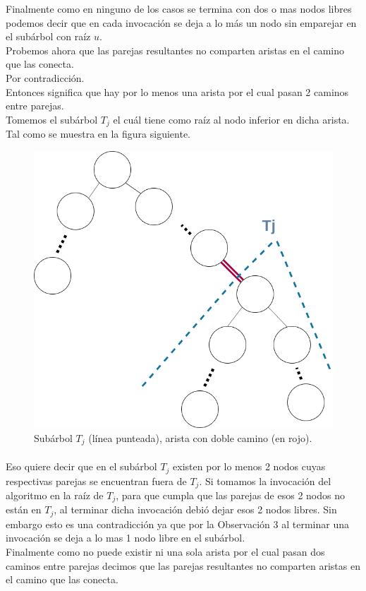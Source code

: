 \documentclass[12pt]{article}
\begin{document}
Finalmente como en ninguno de los casos se termina con dos o mas nodos libres podemos decir que en cada invocación se deja a lo más un nodo sin emparejar  en el subárbol con raíz $u$.\\
Probemos ahora que las parejas resultantes no comparten aristas en el camino que las conecta.\\
Por contradicción.\\
Entonces significa que hay por lo menos una arista por el cual pasan 2 caminos entre parejas. \\
Tomemos el subárbol $T_j$ el cuál tiene como raíz al nodo inferior en dicha arista. Tal como se muestra en la figura siguiente.\\
\begin{figure}[h]
\begin{center}
\includegraphics[scale=0.5]{ARBOL}
	\end{center}
\caption{Subárbol $T_j$ (línea punteada), arista con doble camino (en rojo).}
\end{figure}
\pagebreak
\paragraph{} Eso quiere decir que en el subárbol $T_j$ existen por lo menos 2 nodos cuyas respectivas parejas se encuentran fuera de $T_j$. Si tomamos la invocación del algoritmo en la raíz de $T_j$, para que cumpla que las parejas de esos 2 nodos no están en $T_j$, al terminar dicha invocación debió dejar esos 2 nodos libres. Sin embargo esto es una contradicción ya que por la Observación 3 al terminar una invocación se deja a lo mas 1 nodo libre en el subárbol.\\
Finalmente como no puede existir ni una sola arista por el cual pasan dos caminos entre parejas decimos que  las parejas resultantes no comparten aristas en el camino que las conecta.\\
\pagebreak
\end{document}

